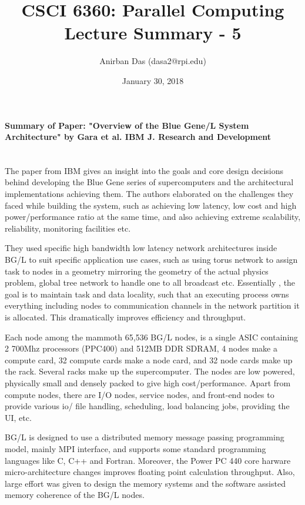 \documentclass[a4paper,12 pt]{article}
\title{\vspace{-2.0cm}CSCI 6360: Parallel Computing Lecture Summary - 5}
\author{Anirban Das (dasa2@rpi.edu) }
\date{January 30, 2018}
\begin{document}
\maketitle

\paragraph{Summary of Paper: "Overview of the Blue Gene/L System Architecture" by Gara et al. IBM J. Research and Development\\\\}

The paper from IBM gives an insight into the goals and core design decisions behind developing the Blue Gene series of supercomputers and the architectural implementations achieving them. The authors elaborated on the challenges they faced while building the system, such as achieving low latency, low cost and high power/performance ratio at the same time, and also achieving extreme scalability, reliability, monitoring facilities etc.

They used specific high bandwidth low latency network architectures inside BG/L to suit specific application use cases, such as using torus network to assign task to nodes in a geometry mirroring the geometry of the actual physics problem, global tree network to handle one to all broadcast etc. Essentially , the goal is to maintain task and data locality, such that an executing process owns everything including nodes to communication channels in the network partition it is allocated. This dramatically improves efficiency and throughput. 

Each node among the mammoth 65,536 BG/L nodes, is a single ASIC containing 2 700Mhz processors (PPC400) and 512MB DDR SDRAM, 4 nodes make a compute card, 32 compute cards make a node card, and 32 node cards make up the rack. Several racks make up the supercomputer. The nodes are low powered, physically small and densely packed to give high cost/performance. Apart from compute nodes, there are I/O nodes, service nodes, and front-end nodes to provide various io/ file handling, scheduling, load balancing jobs, providing the UI, etc. 

BG/L is designed to use a distributed memory message passing programming model, mainly MPI interface, and supports some standard programming languages like C, C++ and Fortran. Moreover, the Power PC 440 core harware micro-architecture changes improves floating point calculation throughput. Also, large effort was given to design the memory systems and the software assisted memory coherence of the BG/L nodes. 
\end{document}
